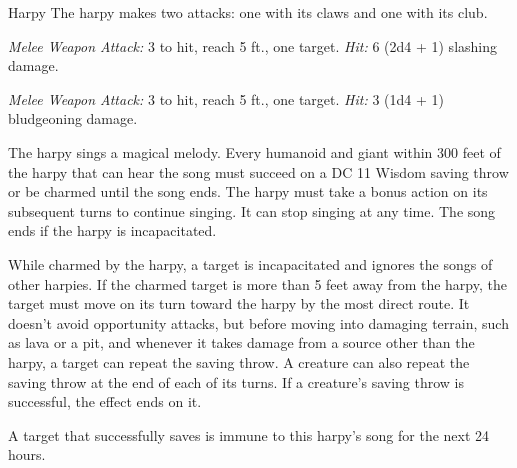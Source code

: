 \documentclass[10pt,a4paper,twoside,bg=print,twocolumn,openany,nodeprecatedcode]{dndbook}
\begin{document}
\begin{DndMonster}[float=t]{Harpy}
\DndMonsterBasics[
armor-class = {11},
hit-points = {\DndDice{7d8 + 7}},
speed = {20 ft., fly 40 ft.}
]
\DndMonsterAbilityScores[
 str = 12,
 dex = 13,
 con = 12,
 int = 7,
 wis = 10,
 cha = 13
]
\DndMonsterDetails[
languages = {Common},
challenge = 1,
]
The harpy makes two attacks: one with its claws and one with its club.

\textsl{Melee Weapon Attack:} 3 to hit, reach 5 ft., one target. \textsl{Hit:} 6 (2d4 + 1) slashing damage.

\textsl{Melee Weapon Attack:} 3 to hit, reach 5 ft., one target. \textsl{Hit:} 3 (1d4 + 1) bludgeoning damage.

The harpy sings a magical melody. Every humanoid and giant within 300 feet of the harpy that can hear the song must succeed on a DC 11 Wisdom saving throw or be charmed until the song ends. The harpy must take a bonus action on its subsequent turns to continue singing. It can stop singing at any time. The song ends if the harpy is incapacitated.

While charmed by the harpy, a target is incapacitated and ignores the songs of other harpies. If the charmed target is more than 5 feet away from the harpy, the target must move on its turn toward the harpy by the most direct route. It doesn't avoid opportunity attacks, but before moving into damaging terrain, such as lava or a pit, and whenever it takes damage from a source other than the harpy, a target can repeat the saving throw. A creature can also repeat the saving throw at the end of each of its turns. If a creature's saving throw is successful, the effect ends on it.

A target that successfully saves is immune to this harpy's song for the next 24 hours.

\end{DndMonster}
\end{document}
